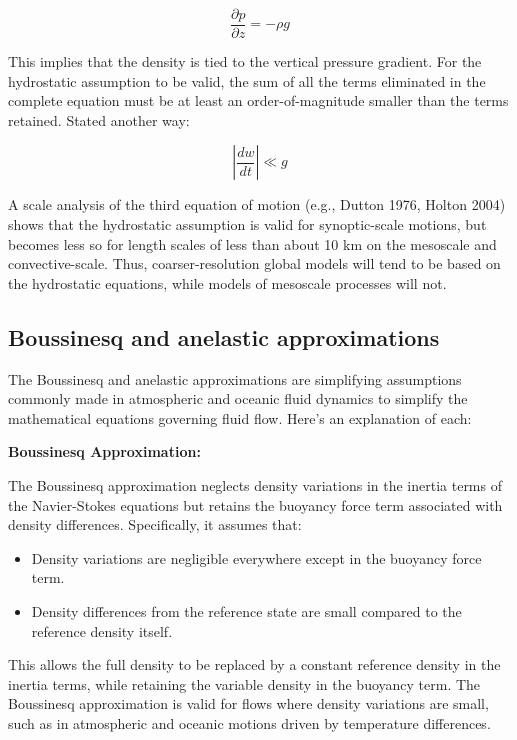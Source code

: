 \documentclass{article}
\begin{document}
\begin{equation}
\frac{\partial p}{\partial z} = -\rho g
\label{eq:31}
\end{equation}

This implies that the density is tied to the vertical pressure gradient. For the hydrostatic assumption to be valid, the sum of all the terms eliminated in the complete equation must be at least an order-of-magnitude smaller than the terms retained. Stated another way:

\begin{equation}
\left|\frac{dw}{dt}\right| \ll g
\label{eq:32}
\end{equation}

A scale analysis of the third equation of motion (e.g., Dutton 1976, Holton 2004) shows that the hydrostatic assumption is valid for synoptic-scale motions, but becomes less so for length scales of less than about 10 km on the mesoscale and convective-scale. Thus, coarser-resolution global models will tend to be based on the hydrostatic equations, while models of mesoscale processes will not.

\subsection{Boussinesq and anelastic approximations}

The Boussinesq and anelastic approximations are simplifying assumptions commonly made in atmospheric and oceanic fluid dynamics to simplify the mathematical equations governing fluid flow. Here's an explanation of each:

\textbf{Boussinesq Approximation:}

The Boussinesq approximation neglects density variations in the inertia terms of the Navier-Stokes equations but retains the buoyancy force term associated with density differences. Specifically, it assumes that:
\begin{itemize}
\item Density variations are negligible everywhere except in the buoyancy force term.
\item Density differences from the reference state are small compared to the reference density itself.
\end{itemize}

This allows the full density to be replaced by a constant reference density in the inertia terms, while retaining the variable density in the buoyancy term. The Boussinesq approximation is valid for flows where density variations are small, such as in atmospheric and oceanic motions driven by temperature differences.
\end{document}
